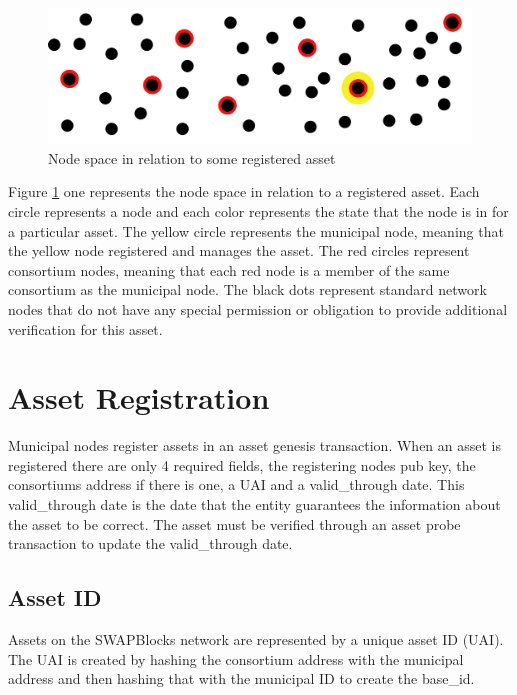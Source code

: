 \documentclass[12pt]{article}
\begin{document}
\begin{figure}[h]
	\centering
	\includegraphics[width=.85\textwidth]{node_space}
	\caption{Node space in relation to some registered asset}
	\label{fig:nodespace1}
\end{figure}


Figure \ref{fig:nodespace1} one represents the node space in relation to a registered asset.
Each circle represents a node and each color represents the state that the
node is in for a particular asset.  The yellow circle represents the municipal node, meaning
that the yellow node registered and manages the asset.  The red circles represent consortium 
nodes, meaning that each red node is a member of the same consortium as the municipal node.
The black dots represent standard network nodes that do not have any special permission or
obligation to provide additional verification for this asset.  






\section{Asset Registration}

Municipal nodes register assets in an asset genesis transaction.  When 
an asset is registered there are only 4 required fields, the registering nodes 
pub key, the consortiums address if there is one, a UAI and a valid\_through date.  
This valid\_through date is the date that the entity guarantees the information 
about the asset to be correct.  The asset must be verified through an asset probe 
transaction to update the valid\_through date.

\subsection{Asset ID}

Assets on the SWAPBlocks network are represented by a unique asset ID (UAI).  
The UAI is created by hashing the consortium address with the municipal address 
and then hashing that with the municipal ID to create the base\_id.
\end{document}
